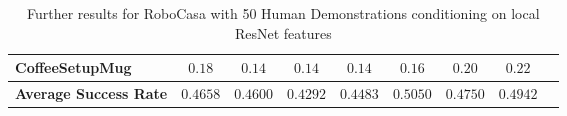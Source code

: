 \begin{table*}[t!]
\begin{center}
\begin{sc}
{\begin{tabular}{l|cccccccc}
CoffeeSetupMug
& $0.18$
& $0.14$
& $0.14$
& $0.14$
& $0.16$
& $0.20$
& $0.22$
\\
\midrule
\textbf{Average Success Rate}
& $0.4658$
& $0.4600$
& $0.4292$
& $0.4483$
& $0.5050$
& $0.4750$
& $0.4942$
\\
\bottomrule
\end{tabular}
}
\end{sc}
\end{center}
    \caption{Further results for RoboCasa with 50 Human Demonstrations conditioning on local ResNet features \\
    }
\label{table:appendix_table}
\end{table*}
